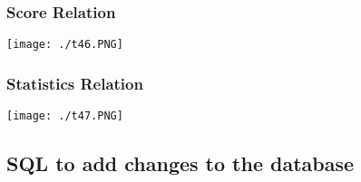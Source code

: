 \documentclass[titlepage]{article}
\begin{document}
\vspace{1em}
\subsubsection{Score Relation}
\vspace{2pt}
\begin{center}
\texttt{[image: ./t46.PNG]}
\end{center}

\vspace{1em}
\subsubsection{Statistics Relation}
\vspace{2pt}
\begin{center}
\texttt{[image: ./t47.PNG]}
\end{center}

\vspace{1em}
\newpage
\subsection{SQL to add changes to the database}
\end{document}
